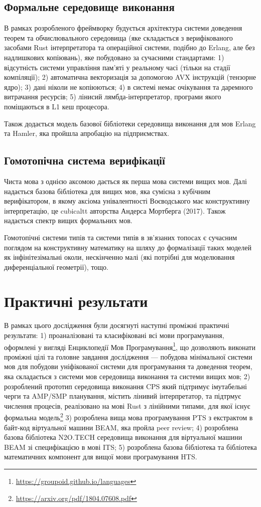 \subsection{Формальне середовище виконання}
В рамках розробленого фреймворку будується
архітектура системи доведення теорем та обчислювального
середовища (яке складається з верифікованого засобами Rust
інтерпретатора та операційної системи, подібно до Erlang, але без надлишкових копіювань),
яке побудовано за сучасними стандартами:
1) відсутність системи управління пам'яті у реальному часі (тільки на стадії компіляції);
2) автоматична векторизація за допомогою AVX інструкцій (тензорне ядро);
3) дані ніколи не копіюються;
4) в системі немає очікування та даремного витрачання ресурсів;
5) лінисий лямбда-інтерпретатор, програми якого поміщаються в L1 кеш процесора.

Також додається модель базової бібліотеки середовища виконання для мов Erlang та Hamler,
яка пройшла апробацію на підприємствах.

\subsection{Гомотопічна система верифікації}
Чиста мова з однією аксомою дається як перша мова системи вищих мов.
Далі надається базова бібліотека для вищих мов, яка сумісна з кубічним верифікатором,
в якому аксіома унівалентності Воєводського має конструктивну інтерпретацію,
це cubicaltt авторства Андерса Мортберга (2017). Також надається спектр вищих формальних мов.

Гомотопічні системи типів та системи типів в зв'язаних топосах є сучасним поглядом на
конструктивну математику на шляху до формалізації таких моделей як інфінітезімальні околи,
нескінченно малі (які потрібні для моделювання диференціальної геометрії), тощо.

\section{Практичні результати}
В рамках цього дослідження були досягнуті наступні проміжні практичні результати:
1) проаналізовані та класифіковані всі мови програмування, оформлені у вигляді
   Енциклопедії Мов Програмування\footnote{\url{https://groupoid.github.io/languages}},
   що дозволяють виконати проміжні цілі та головне завдання дослідження --- побудова
   мінімальної системи мов для побудови уніфікованої системи для програмування та доведення теорем,
   яка складається з системи мов середовища виконання та системи вищих мов;
2) розроблений прототип середовища виконання CPS який підтримує імутабельні черги
   та AMP/SMP планування, містить лінивий інтерпретатор, та підтрмує числення процесів, реалізовано на мові Rust з лінійними типами,
   для якої існує формальна модель\footnote{\url{https://arxiv.org/pdf/1804.07608.pdf}}
3) розроблена вища мова програмування PTS з екстрактом в байт-код віртуальної машини BEAM, яка пройла peer review;
4) розроблена базова бібліотека N2O.TECH середовища виконання для віртуальної машини BEAM зі специфікацією в мові ITS;
5) розроблена базова бібліотека та бібліотека математичних компонент для вищої мови програмування HTS.

